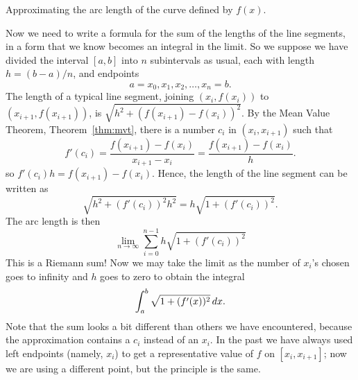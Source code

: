 \begin{marginfigure}[0in]
\caption{Approximating the arc length of the curve defined by $f(x)$.}
\label{fig:approximating arc length}
\end{marginfigure}

Now we need to write a formula for the sum of the lengths of the line
segments, in a form that we know becomes an integral in the limit.  So
we suppose we have divided the interval $[a,b]$ into $n$ subintervals
as usual, each with length $h=(b-a)/n$, and endpoints 
\[
a=x_0, x_1, x_2, \dots, x_n=b.
\]
The length of a typical line segment, joining $(x_i,f(x_i))$ to $
(x_{i+1},f(x_{i+1}))$, is $\sqrt{h^2 +(f(x_{i+1})-f(x_i))^2}$.
By the Mean Value Theorem, Theorem~\ref{thm:mvt}, there is a number $c_i$
in $(x_i,x_{i+1})$ such that 
\[
f'(c_i)=\frac{f(x_{i+1})-f(x_i)}{x_{i+1}-x_i} = \frac{f(x_{i+1})-f(x_i)}{h}.
\]
so $f'(c_i)h=f(x_{i+1})-f(x_i).$ Hence, the length of the line segment
can be written as
$$
  \sqrt{h^2 + (f'(c_i))^2h^2}=
  h\sqrt{1+(f'(c_i))^2}.
$$ 
The arc length is then
\[
\lim_{n\to\infty}\sum_{i=0}^{n-1} h\sqrt{1+(f'(c_i))^2} 
\]
This is a Riemann sum! Now we may take the limit as the number of
$x_i$'s chosen goes to infinity and $h$ goes to zero to obtain the
integral
\[
  \int_a^b \sqrt{1+(f'(x))^2}\, d x.
\]
Note that the sum looks a bit different than others we have
encountered, because the approximation contains a $c_i$ instead of an
$x_i$. In the past we have always used left endpoints (namely, $x_i$)
to get a representative value of $f$ on $[x_i,x_{i+1}]$; now we are
using a different point, but the principle is the same.

